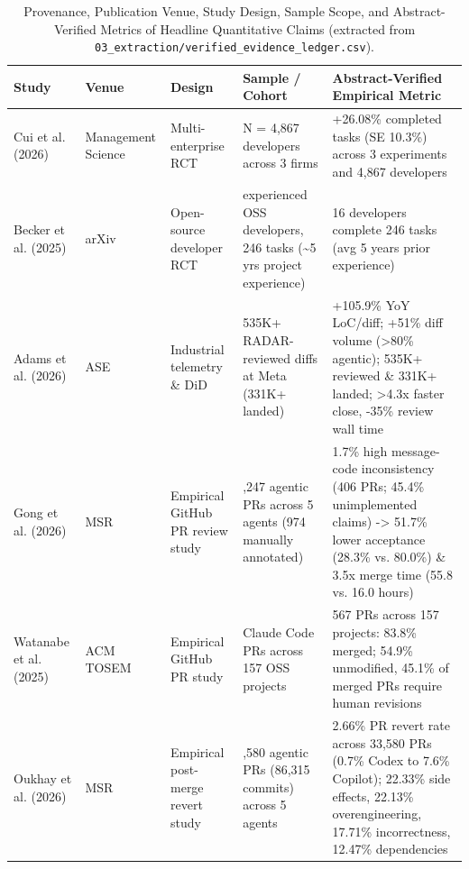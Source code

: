 \documentclass[10pt,twocolumn,a4paper]{article}
\begin{document}
\begin{table}[t!]
\centering
\caption{Provenance, Publication Venue, Study Design, Sample Scope, and Abstract-Verified Metrics of Headline Quantitative Claims (extracted from \texttt{03\_\allowbreak extraction/\allowbreak verified\_\allowbreak evidence\_\allowbreak ledger.\allowbreak csv}).}
\label{tab:provenance}
\scriptsize
\setlength{\tabcolsep}{3.5pt}
\begin{tabularx}{\textwidth}{>{\raggedright\arraybackslash}p{2.45cm} >{\raggedright\arraybackslash}p{1.85cm} >{\raggedright\arraybackslash}p{2.30cm} >{\raggedright\arraybackslash}p{2.80cm} X}
\toprule
\textbf{Study} & \textbf{Venue} & \textbf{Design} & \textbf{Sample / Cohort} & \textbf{Abstract-Verified Empirical Metric} \\
\midrule
Cui et al. (2026)~\cite{cui2026effects} & Management Science & Multi-enterprise RCT & N = 4,867 developers across 3 firms & +26.08\% completed tasks (SE 10.3\%) across 3 experiments and 4,867 developers \\
Becker et al. (2025)~\cite{becker2025measuring} & arXiv & Open-source developer RCT & 16 experienced OSS developers, 246 tasks (\textasciitilde{}5 yrs project experience) & 16 developers complete 246 tasks (avg 5 years prior experience) \\
Adams et al. (2026)~\cite{adams2026automating} & ASE & Industrial telemetry \& DiD & 535K+ RADAR-reviewed diffs at Meta (331K+ landed) & +105.9\% YoY LoC/diff; +51\% diff volume (>80\% agentic); 535K+ reviewed \& 331K+ landed; >4.3x faster close, -35\% review wall time \\
Gong et al. (2026)~\cite{gong2026analyzing} & MSR & Empirical GitHub PR review study & 23,247 agentic PRs across 5 agents (974 manually annotated) & 1.7\% high message-code inconsistency (406 PRs; 45.4\% unimplemented claims) -> 51.7\% lower acceptance (28.3\% vs. 80.0\%) \& 3.5x merge time (55.8 vs. 16.0 hours) \\
Watanabe et al. (2025)~\cite{watanabe2025use} & ACM TOSEM & Empirical GitHub PR study & 567 Claude Code PRs across 157 OSS projects & 567 PRs across 157 projects: 83.8\% merged; 54.9\% unmodified, 45.1\% of merged PRs require human revisions \\
Oukhay et al. (2026)~\cite{oukhay2026code} & MSR & Empirical post-merge revert study & 33,580 agentic PRs (86,315 commits) across 5 agents & 2.66\% PR revert rate across 33,580 PRs (0.7\% Codex to 7.6\% Copilot); 22.33\% side effects, 22.13\% overengineering, 17.71\% incorrectness, 12.47\% dependencies \\

\end{tabularx}
\end{table}
\end{document}
